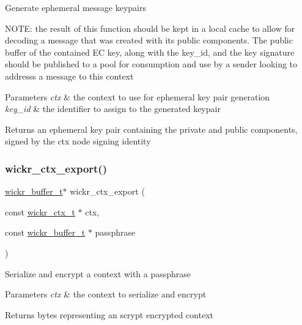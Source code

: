 Generate ephemeral message keypairs

N\+O\+TE\+: the result of this function should be kept in a local cache to allow for decoding a message that was created with it\textquotesingle{}s public components. The public buffer of the contained EC key, along with the key\+\_\+id, and the key signature should be published to a pool for consumption and use by a sender looking to addresss a message to this context


\begin{DoxyParams}{Parameters}
{\em ctx} & the context to use for ephemeral key pair generation \\
\hline
{\em key\+\_\+id} & the identifier to assign to the generated keypair \\
\hline
\end{DoxyParams}
\begin{DoxyReturn}{Returns}
an ephemeral key pair containing the private and public components, signed by the ctx node signing identity 
\end{DoxyReturn}
\mbox{\label{group__wickr__ctx_ga56c41d96d28a8a25336147248361dcb6}} 
\subsubsection{\texorpdfstring{wickr\+\_\+ctx\+\_\+export()}{wickr\_ctx\_export()}}
{\footnotesize\ttfamily \mbox{\hyperlink{structwickr__buffer}{wickr\+\_\+buffer\+\_\+t}}$\ast$ wickr\+\_\+ctx\+\_\+export (\begin{DoxyParamCaption}\item[{const \mbox{\hyperlink{structwickr__ctx}{wickr\+\_\+ctx\+\_\+t}} $\ast$}]{ctx,  }\item[{const \mbox{\hyperlink{structwickr__buffer}{wickr\+\_\+buffer\+\_\+t}} $\ast$}]{passphrase }\end{DoxyParamCaption})}

Serialize and encrypt a context with a passphrase


\begin{DoxyParams}{Parameters}
{\em ctx} & the context to serialize and encrypt \\
\hline
\end{DoxyParams}
\begin{DoxyReturn}{Returns}
bytes representing an scrypt encrypted context 
\end{DoxyReturn}
\mbox{\label{group__wickr__ctx_ga67e64bed3fc0a8ee550c0fc24d44c787}} 
